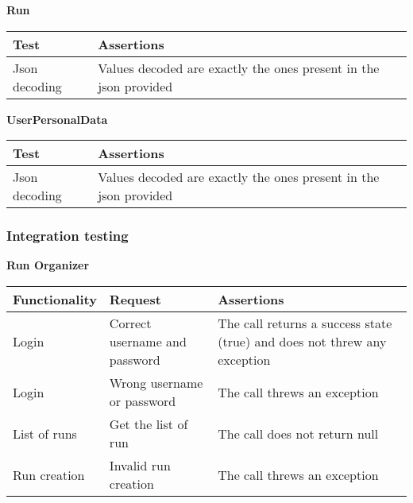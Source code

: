 \noindent\textbf{Run}
\begin{longtable}{|p{}|p{}|}
    \hline
    \textbf{Test} & \textbf{Assertions} \\
    \hline
    Json decoding & Values decoded are exactly the ones present in the json provided\\
    \hline
\end{longtable}

\noindent\textbf{UserPersonalData}
\begin{longtable}{|p{}|p{}|}
    \hline
    \textbf{Test} & \textbf{Assertions} \\
    \hline
    Json decoding & Values decoded are exactly the ones present in the json provided\\
    \hline
\end{longtable}

\subsubsection{Integration testing}
\noindent\textbf{Run Organizer}
\begin{longtable}{|p{}|p{}|p{}|}
    \hline
    \textbf{Functionality} & \textbf{Request} & \textbf{Assertions} \\
    \hline
    Login & Correct username and password & The call returns a success state (true) and does not threw any exception\\
    \hline
    Login & Wrong username or password & The call threws an exception\\
    \hline
    List of runs & Get the list of run & The call does not return null\\
    \hline
    Run creation & Invalid run creation & The call threws an exception\\
    \hline
    
\end{longtable}

